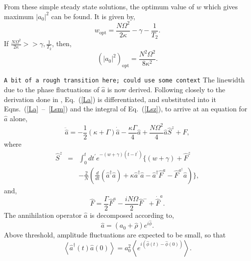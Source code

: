 \documentclass[aps,prl,twocolumn,
superscriptaddress,groupedaddress]{revtex4}
\newcommand{\dmcomment}[1]{{\tt #1}}
\begin{document}
From these simple steady state solutions, the optimum value of $w$ which
gives maximum $|a_0|^2$ can be found. It is given by,
\begin{equation}
w_{\mathrm{opt}} = \frac{N \Omega^2}{2\kappa} - \gamma - \frac{1}{T_2}.
\label{wopt}
\end{equation}
If $\frac{N\Omega^2}{2 \kappa} >> \gamma, \frac{1}{T_2}$, then,
\begin{equation}
(|a_0|^2)_{\mathrm{opt}}= \frac{N^2 \Omega^2}{8\kappa^2}.
\label{adaopt}
\end{equation}

\dmcomment{A bit of a rough transition here; could use some context}
The linewidth due to the phase fluctuations of $\hat{a}$ is now derived.
Following closely to the derivation done in \cite{HakenLaser,
HakenLaserBook}, Eq.~(\ref{La}) is differentiated, and substituted into
it Eqns.~(\ref{La}~--~\ref{Lsm}) and the integral of Eq.~(\ref{Lsz}), to
arrive at an equation for $\hat{a}$ alone,
\begin{equation}
\ddot{\hat{a}} =
-\frac{1}{2} (\kappa+\Gamma)  \dot{\hat{a}} -
\frac{\kappa \Gamma}{4}\hat{a}  +
\frac{N \Omega^2 }{4} \hat{a} \hat{S}^z +\hat{F},
\label{addeq}
\end{equation}
where
\begin{eqnarray}
\hat{S}^z &=&
\int_0^t dt^{\prime} e^{-(w+\gamma)(t-t^{\prime})}
\bigg\{ (w+\gamma) + \hat{F}^z
\nonumber
\\
&&-\frac{2}{N} \left( \frac{d}{dt} (\hat{a}^{\dagger} \hat{a}) +
\kappa \hat{a}^{\dagger} \hat{a} -\hat{a}^{\dagger} \hat{F}^a -
\hat{F}^{a^{\dagger}} \hat{a} \right) \bigg\},
\end{eqnarray}
and,
\begin{equation}
\hat{F} = \frac{\Gamma}{2} \hat{F}^a-
\frac{i N \Omega}{2} \hat{F}^-+\dot{\hat{F}}^a.
\end{equation}
The annihilation operator $\hat{a}$ is decomposed according to,
\begin{equation}
\hat{a}= (a_0 + \hat{\rho}) e^{i\hat{\phi}}.
\label{adecomp}
\end{equation}
Above threshold, amplitude fluctuations are expected to be small, so that
\begin{equation}
\left< \hat{a}^{\dagger}(t) \hat{a}(0) \right> =
a_0^2 \left< e^{i(\hat{\phi}(t) - \hat{\phi}(0))} \right>.
\end{equation}
\end{document}
